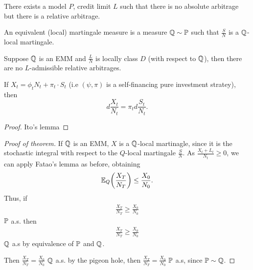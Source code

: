 \begin{remark}
  There exists a model $P$, credit limit $L$ such that there is no
  absolute arbitrage but there is a relative arbitrage. 
\end{remark}

\begin{defn}
  \label{defn:continuous_time:28}
  An equivalent (local) martingale measure is a measure $\Q \sim
  \Prob$ such that $\frac{S}{N}$ is a $\Q$-local martingale.
\end{defn}

\begin{thm}
  \label{defn:continuous_time:29}
  Suppose $\Q$ is an EMM and $\frac{L}{N}$ is locally class $D$ (with
  respect to $\Q$), then there are no $L$-admissible relative
  arbitrages.
\end{thm}

\begin{lem}
  If $X_{t}= \phi_{t} N_{t} + \pi_{t} \cdot S_{t}$ (i.e $(\psi, \pi)$
  is a self-financing pure investment stratey), then
  \begin{equation}
    \label{eq:71}
    d\frac{X_{t}}{N_{t}} = \pi_{t} d \frac{S_{t}}{N_{t}}.
  \end{equation}

\end{lem}

\begin{proof}
  Ito's lemma
\end{proof}

\begin{proof}[Proof of theorem]
  If $\Q$ is an EMM, $X$ is a $\Q$-local martinagle, since it is the
  stochastic integral with respect to the $Q$-local martingale
  $\frac{S}{N}$.  As $\frac{X_{t} + L_{t}}{N_{t}} \geq 0$, we can
  apply Fatao's lemma as before, obtaining
  \begin{align}
    \label{eq:72}
    \E{\frac{X_{T}}{N_{T}}}{Q} \leq \frac{X_{0}}{N_{0}}.
  \end{align}  Thus, if
  \begin{align}
    \label{eq:73}
    \frac{X_{T}}{N_{T}} \geq \frac{X_{0}}{N_{0}}
  \end{align} $\Prob$ a.s.  then
  \begin{align}
    \label{eq:74}
    \frac{X_{T}}{N_{T}} \geq \frac{X_{0}}{N_{0}}
  \end{align} $\Q$ a.s by equivalence of $\Prob$ and $\Q$.

  Then $\frac{X_{T}}{N_{T}} = \frac{X_{0}}{N_{0}}$ $\Q$ a.s. by the
  pigeon hole, then $\frac{X_{T}}{N_{T}} = \frac{X_{0}}{N_{0}}$
  $\Prob$ a.s, since $\Prob \sim \Q$.
\end{proof}

